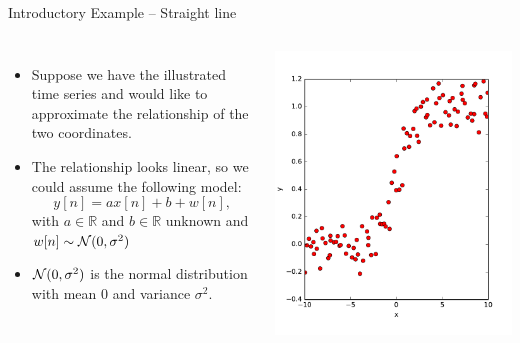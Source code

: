 \documentclass[10pt, aspectratio=169]{beamer} %
\newcommand{\R}{{\mathbb{R}}}
\begin{document}
\begin{frame}[allowframebreaks=0.8,fragile]{Introductory Example -- Straight line}
\begin{columns}[onlytextwidth]
\begin{itemize}
\item Suppose we have the illustrated time series and would like
to approximate the relationship of the two coordinates.
\item The relationship looks linear, so we could assume the following model:
\[
y[n] = ax[n] + b + w[n],
\]
with $a\in\R$ and $b\in\R$ unknown and 
$w[n]\sim {\cal N}(0,\sigma^2)$
\item ${\cal N}(0,\sigma^2)$ is the normal distribution with mean $0$ and variance $\sigma^2$.
\end{itemize}
\centerline{\includegraphics[width=\textwidth]{LSEx1Data.pdf}}
\end{columns}
\end{frame}
\end{document}
